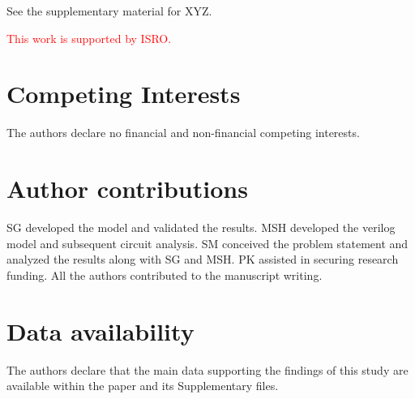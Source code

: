 \documentclass[aip,apl,reprint,floatfix]{revtex4-2}
\newcommand{\changed}[1]{\textcolor{red}{#1}}
\begin{document}

See the supplementary material for XYZ.

\begin{acknowledgments}
\changed{This work is supported by ISRO.}
\end{acknowledgments}

\section{Competing Interests}\label{note}

The authors declare no financial and non-financial competing interests.

\section{Author contributions}\label{contribution}

SG developed the model and validated the results. MSH developed the verilog model and subsequent circuit analysis. SM conceived the problem statement and analyzed the results along with SG and MSH. PK assisted in securing research funding. All the authors contributed to the manuscript writing.

\section{Data availability}\label{Data}

The authors declare that the main data supporting the findings of this study are available within the paper and its Supplementary files. 




%
\nocite{aip41Control}


\end{document}
